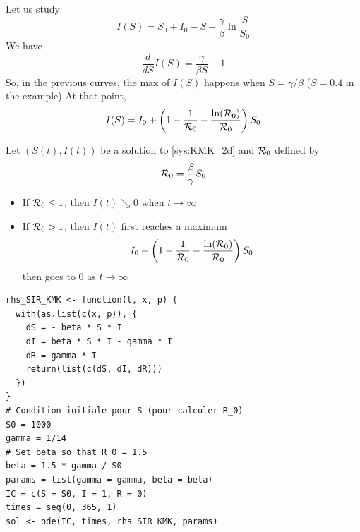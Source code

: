 \documentclass[aspectratio=43]{beamer}
\begin{document}
\begin{frame}{}
  Let us study
  $$
  I(S)=S_0+I_0-S+\frac\gamma\beta \ln \frac S{S_0} 
  $$
  We have
  $$
  \frac{d}{dS}I(S) = \frac{\gamma}{\beta S}-1
  $$
  So, in the previous curves, the max of $I(S)$ happens when $S=\gamma/\beta$ ($S=0.4$ in the example)
  \vfill
  At that point,
  $$
  I(S) = I_0+\left(
    1-\frac{1}{\mathcal{R}_0} - \frac{\ln(\mathcal{R}_0)}{\mathcal{R}_0}
  \right)S_0
  $$
\end{frame}


\begin{frame}{}
  \begin{theorem}
    Let $(S(t),I(t))$ be a solution to \eqref{sys:KMK_2d} and $\mathcal{R}_0$ defined by
    \begin{equation}\label{eq:R0_KMK}
    \mathcal{R}_0=\frac{\beta}{\gamma}S_0
    \end{equation}
    \vfill
    \begin{itemize}
      \item If $\mathcal{R}_0\leq 1$, then $I(t)\searrow 0$ when $t\to\infty$ 
      \item If $\mathcal{R}_0>1$, then $I(t)$ first reaches a maximum 
      \begin{equation}\label{eq:max_I}
        I_0+\left(
      1-\frac{1}{\mathcal{R}_0} - \frac{\ln(\mathcal{R}_0)}{\mathcal{R}_0}
      \right)S_0
      \end{equation}
      then goes to 0 as $t\to\infty$  
    \end{itemize}    
  \end{theorem}
\end{frame}

\begin{frame}[fragile]{}
\begin{lstlisting}
rhs_SIR_KMK <- function(t, x, p) {
  with(as.list(c(x, p)), {
    dS = - beta * S * I
    dI = beta * S * I - gamma * I
    dR = gamma * I
    return(list(c(dS, dI, dR)))
  })
}
# Condition initiale pour S (pour calculer R_0)
S0 = 1000
gamma = 1/14
# Set beta so that R_0 = 1.5
beta = 1.5 * gamma / S0 
params = list(gamma = gamma, beta = beta)
IC = c(S = S0, I = 1, R = 0)
times = seq(0, 365, 1)
sol <- ode(IC, times, rhs_SIR_KMK, params)  
\end{lstlisting}
\end{frame}
\end{document}
